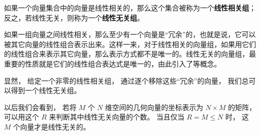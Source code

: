 

如果一个向量集合中的向量是线性相关的，那么这个集合被称为一个\textbf{线性相关组}；反之，若线性无关，则称为一个\textbf{线性无关组}。

如果一组向量之间线性相关，那么至少有一个向量是“冗余”的，也就是说，它可以被其它向量的线性组合表示出来。这样一来，对于线性相关的向量组，如果用它们的线性组合来表示其它向量，那么表示方式都不是唯一的。线性无关的向量组，最重要的性质就是它们的线性组合表达式是唯一的，由此引入了等概念。

显然， 给定一个非零的线性相关组， 通过逐个移除这些“冗余”的向量， 我们总可以得到一个线性无关组。

以后我们会看到， 若将 $M$ 个 $N$ 维空间的几何向量的坐标表示为 $N\times M$ 的矩阵， 可以用这个 $R$ 来判断其中线性无关向量的个数。 当且仅当 $R = M \leqslant N$ 时， 这 $M$ 个向量才是线性无关的。
